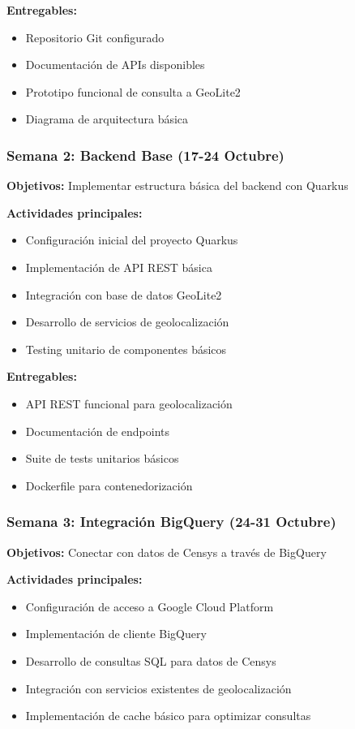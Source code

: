 \textbf{Entregables:}
\begin{itemize}
    \item Repositorio Git configurado
    \item Documentación de APIs disponibles
    \item Prototipo funcional de consulta a GeoLite2
    \item Diagrama de arquitectura básica
\end{itemize}

\subsubsection{Semana 2: Backend Base (17-24 Octubre)}
\textbf{Objetivos:} Implementar estructura básica del backend con Quarkus

\textbf{Actividades principales:}
\begin{itemize}
    \item Configuración inicial del proyecto Quarkus
    \item Implementación de API REST básica
    \item Integración con base de datos GeoLite2
    \item Desarrollo de servicios de geolocalización
    \item Testing unitario de componentes básicos
\end{itemize}

\textbf{Entregables:}
\begin{itemize}
    \item API REST funcional para geolocalización
    \item Documentación de endpoints
    \item Suite de tests unitarios básicos
    \item Dockerfile para contenedorización
\end{itemize}

\subsubsection{Semana 3: Integración BigQuery (24-31 Octubre)}
\textbf{Objetivos:} Conectar con datos de Censys a través de BigQuery

\textbf{Actividades principales:}
\begin{itemize}
    \item Configuración de acceso a Google Cloud Platform
    \item Implementación de cliente BigQuery
    \item Desarrollo de consultas SQL para datos de Censys
    \item Integración con servicios existentes de geolocalización
    \item Implementación de cache básico para optimizar consultas
\end{itemize}

